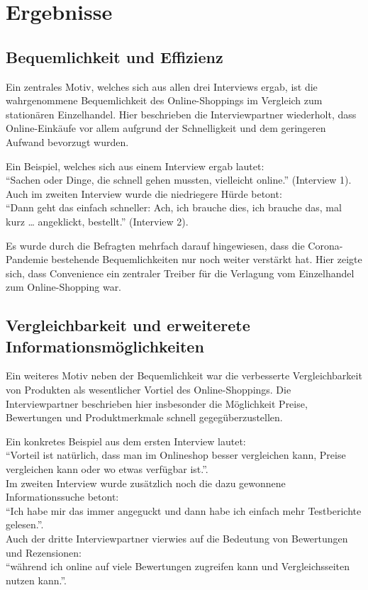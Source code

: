 \section{Ergebnisse}
\subsection{Bequemlichkeit und Effizienz}
Ein zentrales Motiv, welches sich aus allen drei Interviews ergab, ist die wahrgenommene Bequemlichkeit des Online-Shoppings im Vergleich zum stationären Einzelhandel. Hier beschrieben die Interviewpartner wiederholt, dass Online-Einkäufe vor allem aufgrund der Schnelligkeit und dem geringeren Aufwand bevorzugt wurden.

Ein Beispiel, welches sich aus einem Interview ergab lautet:\\  \enquote{Sachen oder Dinge, die schnell gehen mussten, vielleicht online.} (Interview 1).\\  Auch im zweiten Interview wurde die niedriegere Hürde betont:\\ \enquote{Dann geht das einfach schneller: Ach, ich brauche dies, ich brauche das, mal kurz … angeklickt, bestellt.} (Interview 2).

Es wurde durch die Befragten mehrfach darauf hingewiesen, dass die Corona-Pandemie bestehende Bequemlichkeiten nur noch weiter verstärkt hat. Hier zeigte sich, dass Convenience ein zentraler Treiber für die Verlagung vom Einzelhandel zum Online-Shopping war.

\subsection{Vergleichbarkeit und erweiterete Informationsmöglichkeiten}
Ein weiteres Motiv neben der Bequemlichkeit war die verbesserte Vergleichbarkeit von Produkten als wesentlicher Vortiel des Online-Shoppings. Die Interviewpartner beschrieben hier insbesonder die Möglichkeit Preise, Bewertungen und Produktmerkmale schnell gegegüberzustellen.

Ein konkretes Beispiel aus dem ersten Interview lautet:\\  \enquote{Vorteil ist natürlich, dass man im Onlineshop besser vergleichen kann, Preise vergleichen kann oder wo etwas verfügbar ist.}.\\  Im zweiten Interview wurde zusätzlich noch die dazu gewonnene Informationssuche betont:\\ \enquote{Ich habe mir das immer angeguckt und dann habe ich einfach mehr Testberichte gelesen.}.\\  Auch der dritte Interviewpartner vierwies auf die Bedeutung von Bewertungen und Rezensionen:\\  \enquote{während ich online auf viele Bewertungen zugreifen kann und Vergleichsseiten nutzen kann.}.

